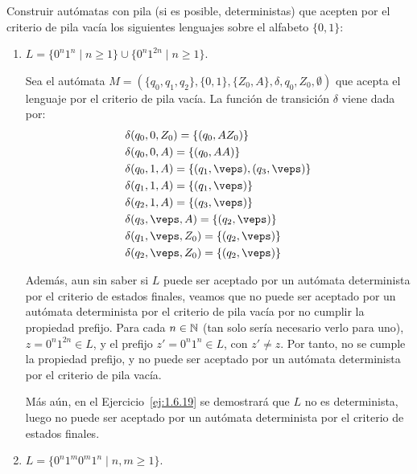 \begin{ejercicio}\label{ej:1.5.18}
    Construir autómatas con pila (si es posible, deterministas) que acepten por el criterio de pila vacía los siguientes lenguajes sobre el alfabeto $\{0,1\}$:
    \begin{enumerate}
        \item $L = \{0^n 1^n \mid n\geq 1\} \cup \{0^n 1^{2n}\mid n\geq 1\}$.
        
        Sea el autómata $M = (\{q_0,q_1,q_2\},\{0,1\},\{Z_0,A\},\delta,q_0,Z_0,\emptyset)$ que acepta el lenguaje por el criterio de pila vacía. La función de transición $\delta$ viene dada por:
        \begin{align*}
            &\delta(q_0,0,Z_0) = \{(q_0,AZ_0)\} \\
            &\delta(q_0,0,A) = \{(q_0,AA)\} \\
            &\delta(q_0,1,A) = \{(q_1,\veps), (q_3,\veps)\} \\
            &\delta(q_1,1,A) = \{(q_1,\veps)\} \\
            &\delta(q_2,1,A) = \{(q_3,\veps)\} \\
            &\delta(q_3,\veps,A) = \{(q_2,\veps)\} \\
            &\delta(q_1,\veps,Z_0) = \{(q_2,\veps)\} \\
            &\delta(q_2,\veps,Z_0) = \{(q_2,\veps)\}
        \end{align*}

        Además, aun sin saber si $L$ puede ser aceptado por un autómata determinista por el criterio de estados finales, veamos que no puede ser aceptado por un autómata determinista por el criterio de pila vacía por no cumplir la propiedad prefijo. Para cada $n\in \mathbb{N}$ (tan solo sería necesario verlo para uno), $z=0^n1^{2n}\in L$, y el prefijo $z'=0^n1^n\in L$, con $z'\neq z$. Por tanto, no se cumple la propiedad prefijo, y no puede ser aceptado por un autómata determinista por el criterio de pila vacía.

        Más aún, en el Ejercicio~\ref{ej:1.6.19} se demostrará que $L$ no es determinista, luego no puede ser aceptado por un autómata determinista por el criterio de estados finales.
        \item $L = \{0^n 1^m 0^m 1^n \mid n,m\geq 1\}$.
        

\end{enumerate}
\end{ejercicio}

